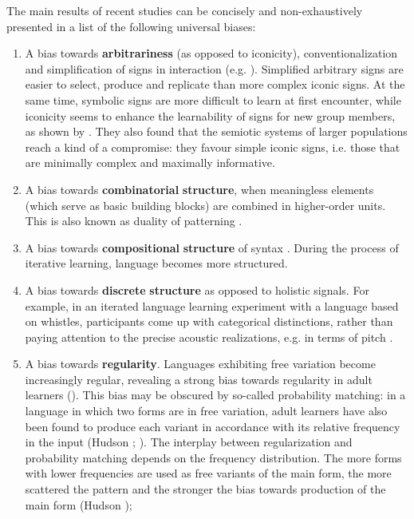 \documentclass[output=paper]{langsci/langscibook}
\begin{document}
The main results of recent studies can be concisely and non-exhaustively presented in a list of the following universal biases: 

\begin{enumerate}
\item 
A bias towards \textbf{arbitrariness} (as opposed to iconicity), conventionalization and simplification of signs in interaction (e.g. \citealt{CaldwellSmith2012}). Simplified arbitrary signs are easier to select, produce and replicate than more complex iconic signs. At the same time, symbolic signs are more difficult to learn at first encounter, while iconicity seems to enhance the learnability of signs for new group members, as shown by \citet{FayEllison2013}. They also found that the semiotic systems of larger populations reach a kind of a compromise: they favour simple iconic signs, i.e. those that are minimally complex and maximally informative.
\item 
A bias towards \textbf{combinatorial} \textbf{structure}, when meaningless elements (which serve as basic building blocks) are combined in higher-order units. This is also known as duality of patterning \citep{Verhoef2012}.
\item 
A bias towards \textbf{compositional} \textbf{structure} of syntax \citep{KirbyEtAl2008}. During the process of iterative learning, language becomes more structured.
\item 
A bias towards \textbf{discrete} \textbf{structure} as opposed to holistic signals. For example, in an iterated language learning experiment with a language based on whistles, participants come up with categorical distinctions, rather than paying attention to the precise acoustic realizations, e.g. in terms of pitch \citep{Verhoef2012}.
\item 
A bias towards \textbf{regularity}. Languages exhibiting free variation become increasingly regular, revealing a strong bias towards regularity in adult learners (\citealt{SmithWonnacott2010}). This bias may be obscured by so-called probability matching: in a language in which two forms are in free variation, adult learners have also been found to produce each variant in accordance with its relative frequency in the input (Hudson \citealt{KamNewport2009}; \citealt{WonnacottNewport2005}). The interplay between regularization and probability matching depends on the frequency distribution. The more forms with lower frequencies are used as free variants of the main form, the more scattered the pattern and the stronger the bias towards production of the main form (Hudson \citealt{KamNewport2009});

\end{enumerate}
\end{document}
